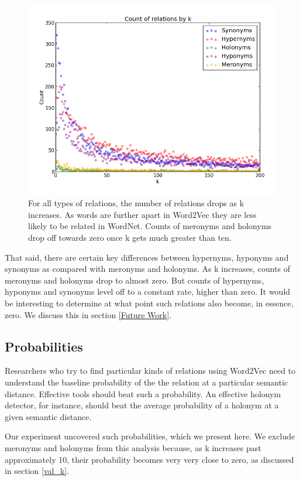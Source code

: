 \documentclass{article}
\begin{document}
\begin{figure}[!hb]
  \includegraphics[scale=.5]{total.png}
  \caption{For all types of relations, the number of relations drops as k increases. As words are further apart in Word2Vec they are less likely to be related in WordNet. Counts of meronyms and holonyms drop off towards zero once k gets much greater than ten.}
  \label{fig:all_counts}
\end{figure}

That said, there are certain key differences between hypernyms, hyponyms and synonyms as compared with meronyms and holonyms. As k increases, counts of meronyms and holonyms drop to almost zero. But counts of hypernyms, hyponyms and synonyms level off to a constant rate, higher than zero. It would be interesting to determine at what point such relations also become, in essence, zero. We discuss this in section \ref{Future Work}.

\subsection{Probabilities}
Researchers who try to find particular kinds of relations using Word2Vec need to understand the baseline probability of the the relation at a particular semantic distance. Effective tools should beat such a probability. An effective holonym detector, for instance, should beat the average probability of a holonym at a given semantic distance. 

Our experiment uncovered such probabilities, which we present here. We exclude meronyms and holonyms from this analysis because, as k increases past approximately 10, their probability becomes very very close to zero, as discussed in section \ref{val_k}.
\end{document}
